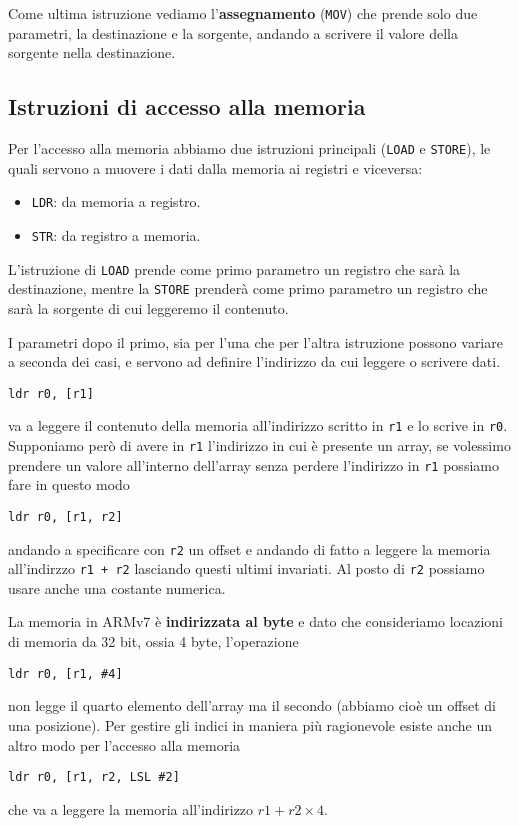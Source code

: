 Come ultima istruzione vediamo l'\textbf{assegnamento} (\verb|MOV|) che prende solo due parametri,
la destinazione e la sorgente, andando a scrivere il valore della sorgente nella destinazione.

\subsection{Istruzioni di accesso alla memoria}
Per l'accesso alla memoria abbiamo due istruzioni principali (\verb|LOAD| e \verb|STORE|), le quali
servono a muovere i dati dalla memoria ai registri e viceversa:
\begin{itemize}
	\item \verb|LDR|: da memoria a registro.
	\item \verb|STR|: da registro a memoria.
\end{itemize}
L'istruzione di \verb|LOAD| prende come primo parametro un registro che sarà la destinazione,
mentre la \verb|STORE| prenderà come primo parametro un registro che sarà la sorgente di cui
leggeremo il contenuto.

I parametri dopo il primo, sia per l'una che per l'altra istruzione possono variare a seconda dei
casi, e servono ad definire l'indirizzo da cui leggere o scrivere dati.
\begin{verbatim}
ldr r0, [r1]
\end{verbatim}
va a leggere il contenuto della memoria all'indirizzo scritto in \verb|r1| e lo scrive in \verb|r0|.
Supponiamo però di avere in \verb|r1| l'indirizzo in cui è presente un array, se volessimo prendere
un valore all'interno dell'array senza perdere l'indirizzo in \verb|r1| possiamo fare in questo
modo
\begin{verbatim}
ldr r0, [r1, r2]
\end{verbatim}
andando a specificare con \verb|r2| un offset e andando di fatto a leggere la memoria all'indirzzo
\verb|r1 + r2| lasciando questi ultimi invariati. Al posto di \verb|r2| possiamo usare anche una
costante numerica.

La memoria in ARMv7 è \textbf{indirizzata al byte} e dato che consideriamo locazioni di memoria da
32 bit, ossia 4 byte, l'operazione
\begin{verbatim}
ldr r0, [r1, #4]
\end{verbatim}
non legge il quarto elemento dell'array ma il secondo (abbiamo cioè un offset di una posizione).
Per gestire gli indici in maniera più ragionevole esiste anche un altro modo per l'accesso alla
memoria
\begin{verbatim}
ldr r0, [r1, r2, LSL #2]
\end{verbatim}
che va a leggere la memoria all'indirizzo $r1 + r2 \times 4$.